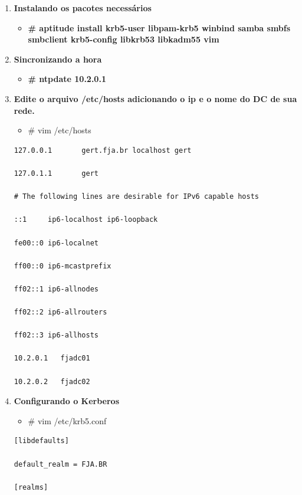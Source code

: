 \begin{enumerate}
	\item \textbf{Instalando os pacotes necessários}
\begin{itemize}
	\item \textbf{\# aptitude install krb5-user libpam-krb5 winbind samba smbfs smbclient krb5-config libkrb53 libkadm55 vim}
\end{itemize}

	\item \textbf{Sincronizando a hora}

\begin{itemize}
	\item \textbf{\# ntpdate 10.2.0.1} 
\end{itemize}

	\item \textbf{Edite o arquivo /etc/hosts adicionando o ip e o nome do DC de sua rede.}
	\begin{itemize}
			\item \# vim /etc/hosts\\
	\end{itemize}
		\begin{lstlisting}
127.0.0.1       gert.fja.br localhost gert

127.0.1.1       gert

# The following lines are desirable for IPv6 capable hosts

::1     ip6-localhost ip6-loopback

fe00::0 ip6-localnet

ff00::0 ip6-mcastprefix

ff02::1 ip6-allnodes

ff02::2 ip6-allrouters

ff02::3 ip6-allhosts

10.2.0.1   fjadc01

10.2.0.2   fjadc02

\end{lstlisting}

	\item \textbf{Configurando o Kerberos}
		\begin{itemize}
			\item {\# vim /etc/krb5.conf}\\
		\end{itemize}
		\begin{lstlisting}
[libdefaults]

default_realm = FJA.BR

[realms]


\end{lstlisting}
\end{enumerate}
